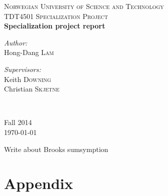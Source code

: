 \documentclass[12pt, a4paper]{article}
\begin{document}
\begin{titlepage}



\textsc{\LARGE Norwegian University of Science and Technology}\\[1.5cm]

\textsc{\Large TDT4501 Specialization Project}\\[0.5cm]


{ \huge \bfseries Specialization project report \\[0.4cm] }


\noindent
\begin{minipage}{0.4\textwidth}
\begin{flushleft} \large
\emph{Author:}\\
Hong-Dang \textsc{Lam}
\end{flushleft}
\end{minipage}%
\begin{minipage}{0.4\textwidth}
\begin{flushright} \large
\emph{Supervisors:} \\
Keith \textsc{Downing}\\
Christian \textsc{Skjetne}
\end{flushright}
\end{minipage}\\

\vfill

{Fall 2014\\\large \today}

\end{titlepage}




\newpage
\begin{abstract}

\end{abstract}

\newpage
\tableofcontents
\newpage
\listoffigures
\newpage
\listoftables
\newpage
{}


Write about Brooks sumsymption







\nocite{*}


\newpage
\section{Appendix}
\label{sec:app}
\appendix

	
\end{document}
